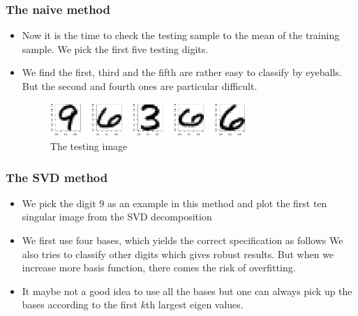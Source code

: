 \documentclass[10pt]{beamer}
\begin{document}
\begin{frame}
\frametitle{The naive method}

\begin{itemize}
\item Now it is the time to check the testing sample to the mean of the training
sample. We pick the first five testing digits.

\item  We find the first, third and the fifth are rather
easy to classify by eyeballs. But the second and fourth ones are particular
difficult.
\begin{figure}
  \centering
  \includegraphics[width=0.7\textwidth]{test5.eps}
  \caption{The testing image}
  \label{fig:test5}
\end{figure}

\end{itemize}
\end{frame}



\begin{frame}
\frametitle{The SVD method}

\begin{itemize}
\item We pick the digit $9$ as an example in this method and plot the first ten
singular image from the SVD decomposition

\item We first use four bases, which yields the correct specification as
  follows We also tries to classify other digits which gives robust
  results. But when we increase more basis function, there comes the risk of
  overfitting.

\item It maybe not a good idea to use all the bases but one can always pick up
  the bases according to the first $k$th largest eigen values.

\end{itemize}

\end{frame}
\end{document}
